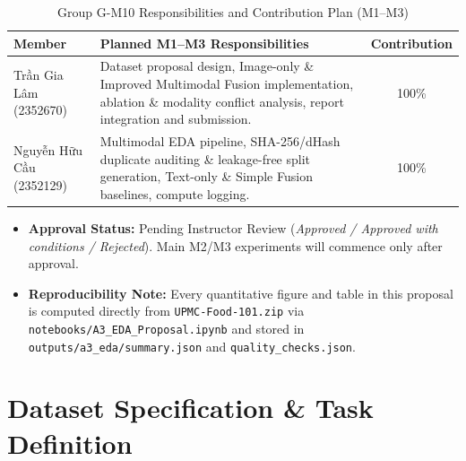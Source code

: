 \documentclass[twoside,final]{hcmut-report}
\begin{document}
\begin{table}[H]
\centering
\caption{Group G-M10 Responsibilities and Contribution Plan (M1--M3)}
\begin{tabularx}{\linewidth}{l X c}
\toprule
\textbf{Member} & \textbf{Planned M1--M3 Responsibilities} & \textbf{Contribution} \\
\midrule
Trần Gia Lâm (2352670) & Dataset proposal design, Image-only \& Improved Multimodal Fusion implementation, ablation \& modality conflict analysis, report integration and submission. & 100\% \\
Nguyễn Hữu Cầu (2352129) & Multimodal EDA pipeline, SHA-256/dHash duplicate auditing \& leakage-free split generation, Text-only \& Simple Fusion baselines, compute logging. & 100\% \\
\bottomrule
\end{tabularx}
\end{table}

\begin{itemize}
    \item \textbf{Approval Status:} Pending Instructor Review (\emph{Approved / Approved with conditions / Rejected}). Main M2/M3 experiments will commence only after approval.
    \item \textbf{Reproducibility Note:} Every quantitative figure and table in this proposal is computed directly from \texttt{UPMC-Food-101.zip} via \texttt{notebooks/A3\_EDA\_Proposal.ipynb} and stored in \texttt{outputs/a3\_eda/summary.json} and \texttt{quality\_checks.json}.
\end{itemize}

\section{Dataset Specification \& Task Definition}
\end{document}
